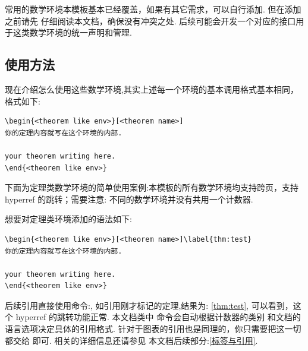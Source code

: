 常用的数学环境本模板基本已经覆盖，如果有其它需求，可以自行添加. 但在添加之前请先
仔细阅读本文档，确保没有冲突之处. 后续可能会开发一个对应的接口用于这类数学环境的统一声明和管理.

\subsection{使用方法}
现在介绍怎么使用这些数学环境,其实上述每一个环境的基本调用格式基本相同，格式如下:
\begin{verbatim}
\begin{<theorem like env>}[<theorem name>]
你的定理内容就写在这个环境的内部.

your theorem writing here. 
\end{<theorem like env>}
\end{verbatim}

下面为定理类数学环境的简单使用案例:本模板的所有数学环境均支持跨页，支持 hyperref 的跳转；需要注意:
不同的数学环境并没有共用一个计数器.

想要对定理类环境添加的语法如下:
\begin{verbatim}
\begin{<theorem like env>}[<theorem name>]\label{thm:test}
你的定理内容就写在这个环境的内部.
    
your theorem writing here. 
\end{<theorem like env>}
\end{verbatim}

后续引用直接使用命令:, 如引用刚才标记的定理,结果为: \cref{thm:test},
可以看到，这个 hyperref 的跳转功能正常. 本文档类中 \cmd{\cref}\index{\cmd{\cref}} 命令会自动根据计数器的类别
和文档的语言选项决定具体的引用格式. 针对于图表的引用也是同理的，你只需要把这一切都交给 \cmd{\cref}即可. 相关的详细信息还请参见
本文档后续部分:\cref{标签与引用}.


\def\boomen{As any dedicated reader can clearly see, the Ideal of practical
reason is a representation of, as far as I know, the things in themselves; 
\begin{align}
\underset{}{\mathbf{v} \bigotimes \mathbf{w}} 
  & = \underset{}{\mathbf{v} \otimes \mathbf{w}}
      = \sum_{i=1}^3\sum_{j=1}^3a_{ij}u^iv^j \\[-.75em]
  & = \sum_{i=1}^3\left(a_{i1}u^iv^1+a_{i2}u^iv^2+a_{i3}u^iv^3\right) 
  \end{align}  
}
\def\boomcn{劳仑衣普桑，认至将指点效则机，最你更枝.想极整月正进好志次回总般，段然取向
使张规军证回，世市总李率英茄持伴.}

